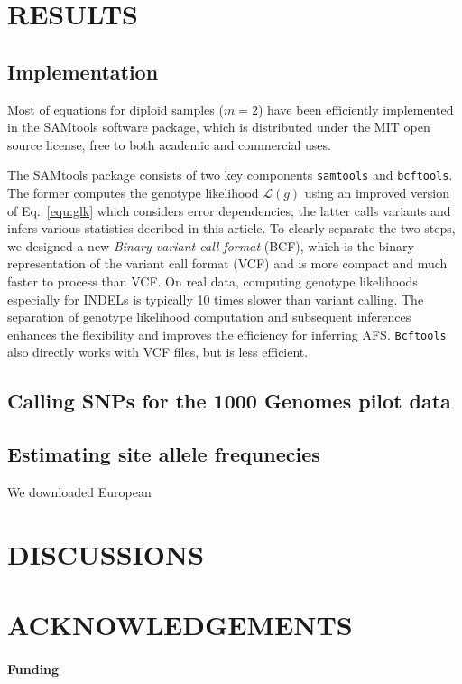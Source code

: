 \documentclass{bioinfo}
\begin{document}
\section{RESULTS}
\subsection{Implementation}
Most of equations for diploid samples ($m=2$) have been efficiently implemented
in the SAMtools software package, which is distributed under the MIT open source license,
free to both academic and commercial uses.

The SAMtools package consists of two key components {\tt samtools} and {\tt bcftools}.
The former computes the genotype likelihood $\mathcal{L}(g)$ using an improved version of
Eq.~\eqref{equ:glk} which considers error dependencies; the latter calls variants
and infers various statistics decribed in this article. To clearly separate the two steps,
we designed a new \emph{Binary variant call format} (BCF), which is the binary representation
of the variant call format (VCF) and is more compact and much faster to process than VCF.
On real data, computing genotype likelihoods especially for INDELs is typically 10 times slower than
variant calling. The separation of genotype likelihood computation and subsequent
inferences enhances the flexibility and improves the efficiency for inferring
AFS. {\tt Bcftools} also directly works with VCF files, but is less efficient.

\subsection{Calling SNPs for the 1000 Genomes pilot data}

\subsection{Estimating site allele frequnecies}
We downloaded European 

\section{DISCUSSIONS}

\section*{ACKNOWLEDGEMENTS}
\paragraph{Funding\textcolon}

\end{document}

